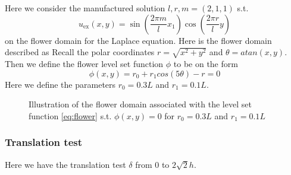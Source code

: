Here we consider the manufactured solution $l,r,m = (2, 1, 1) $ s.t.
\[
u_{\text{ex}}(x,y) = \sin\left(\frac{2\pi m}{l}x_1\right)\cos\left(\frac{2\pi r}{l}y\right)
\]
on the flower domain for the Laplace equation. Here is the flower domain described as
 Recall the polar coordinates $r = \sqrt{x^2 + y^2}$ and $\theta = atan( x,y) $. Then we define the flower level set function $\phi$ to be on the form
 \begin{equation}
 \label{eq:flower}
\phi(x, y) = r_0 + r_1  cos(5 \theta) - r = 0
 \end{equation}
Here we define the parameters $r_0= 0.3L$ and $ r_1=0.1L$.
\begin{figure}
    \centering
{}
\caption{Illustration of the flower domain associated with the level set function \eqref{eq:flower} s.t. $\phi ( x,y) =0$ for $r_{0} = 0.3L$ and $r_{1} = 0.1L$ }
\end{figure}

\subsubsection{Translation test}%
\label{ssub:translation_test}


Here we have the translation test $\delta $ from $0$ to $2 \sqrt{2}h $.


